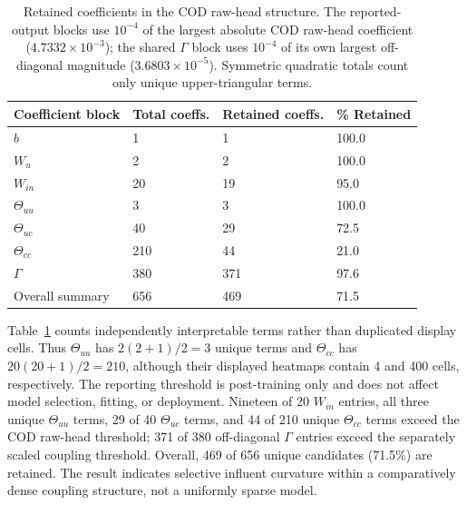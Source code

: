 \documentclass[a4paper,fleqn]{cas-sc}
\DeclareRobustCommand{\currentrev}[1]{{\color{currentRevisionBlue}#1}}
\newenvironment{currentrevblock}{\begingroup\color{currentRevisionBlue}}{\endgroup}
\DeclareRobustCommand{\currentrev}[1]{#1}
\newenvironment{currentrevblock}{}{}
\newenvironment{revblock}{}{}
\newenvironment{revblockr21}{}{}
\begin{document}
\begin{revblock}
\begin{revblockr21}
\begin{table}[htbp]
\centering
\caption{\currentrev{Retained coefficients in the COD raw-head structure. The reported-output blocks use $10^{-4}$ of the largest absolute COD raw-head coefficient ($4.7332\times10^{-3}$); the shared $\Gamma$ block uses $10^{-4}$ of its own largest off-diagonal magnitude ($3.6803\times10^{-5}$). Symmetric quadratic totals count only unique upper-triangular terms.}}
\label{tab:results_icsor_regularization_sample}
\scriptsize
\setlength{\tabcolsep}{4pt}
\begin{tabular}{p{3.0cm}p{2.1cm}p{2.4cm}p{2.0cm}}
\hline
\currentrev{Coefficient block} & \currentrev{Total coeffs.} & \currentrev{Retained coeffs.} & \currentrev{\% Retained} \\
\hline
\currentrev{$b$} & \currentrev{1} & \currentrev{1} & \currentrev{100.0} \\
\currentrev{$W_u$} & \currentrev{2} & \currentrev{2} & \currentrev{100.0} \\
\currentrev{$W_{in}$} & \currentrev{20} & \currentrev{19} & \currentrev{95.0} \\
\currentrev{$\Theta_{uu}$} & \currentrev{3} & \currentrev{3} & \currentrev{100.0} \\
\currentrev{$\Theta_{uc}$} & \currentrev{40} & \currentrev{29} & \currentrev{72.5} \\
\currentrev{$\Theta_{cc}$} & \currentrev{210} & \currentrev{44} & \currentrev{21.0} \\
\currentrev{$\Gamma$} & \currentrev{380} & \currentrev{371} & \currentrev{97.6} \\
\currentrev{Overall summary} & \currentrev{656} & \currentrev{469} & \currentrev{71.5} \\
\hline
\end{tabular}
\end{table}

\begin{currentrevblock}
Table~\ref{tab:results_icsor_regularization_sample} counts independently interpretable terms rather than duplicated display cells. Thus $\Theta_{uu}$ has $2(2+1)/2=3$ unique terms and $\Theta_{cc}$ has $20(20+1)/2=210$, although their displayed heatmaps contain 4 and 400 cells, respectively. The reporting threshold is post-training only and does not affect model selection, fitting, or deployment. Nineteen of 20 $W_{in}$ entries, all three unique $\Theta_{uu}$ terms, 29 of 40 $\Theta_{uc}$ terms, and 44 of 210 unique $\Theta_{cc}$ terms exceed the COD raw-head threshold; 371 of 380 off-diagonal $\Gamma$ entries exceed the separately scaled coupling threshold. Overall, 469 of 656 unique candidates (71.5\%) are retained. The result indicates selective influent curvature within a comparatively dense coupling structure, not a uniformly sparse model.
\end{currentrevblock}


\end{revblockr21}
\end{revblock}
\end{document}
